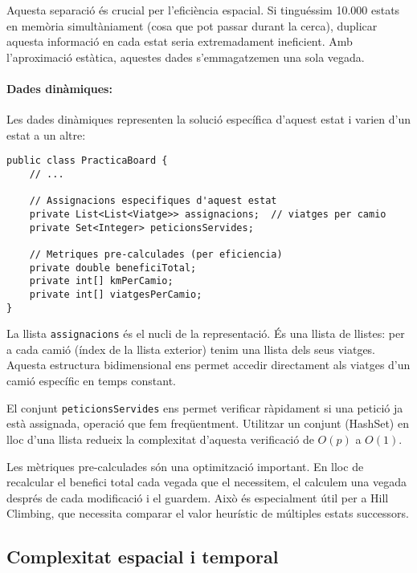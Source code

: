 Aquesta separació és crucial per l'eficiència espacial. Si tinguéssim 10.000 estats en memòria simultàniament (cosa que pot passar durant la cerca), duplicar aquesta informació en cada estat seria extremadament ineficient. Amb l'aproximació estàtica, aquestes dades s'emmagatzemen una sola vegada.

\paragraph{Dades dinàmiques:}

Les dades dinàmiques representen la solució específica d'aquest estat i varien d'un estat a un altre:

\begin{lstlisting}[caption={Dades dinàmiques de l'estat}, label={lst:dynamic-data}]
public class PracticaBoard {
    // ...
    
    // Assignacions especifiques d'aquest estat
    private List<List<Viatge>> assignacions;  // viatges per camio
    private Set<Integer> peticionsServides;
    
    // Metriques pre-calculades (per eficiencia)
    private double beneficiTotal;
    private int[] kmPerCamio;
    private int[] viatgesPerCamio;
}
\end{lstlisting}

La llista \texttt{assignacions} és el nucli de la representació. És una llista de llistes: per a cada camió (índex de la llista exterior) tenim una llista dels seus viatges. Aquesta estructura bidimensional ens permet accedir directament als viatges d'un camió específic en temps constant.

El conjunt \texttt{peticionsServides} ens permet verificar ràpidament si una petició ja està assignada, operació que fem freqüentment. Utilitzar un conjunt (HashSet) en lloc d'una llista redueix la complexitat d'aquesta verificació de $O(p)$ a $O(1)$.

Les mètriques pre-calculades són una optimització important. En lloc de recalcular el benefici total cada vegada que el necessitem, el calculem una vegada després de cada modificació i el guardem. Això és especialment útil per a Hill Climbing, que necessita comparar el valor heurístic de múltiples estats successors.


\vspace{0.5cm}

\subsection{Complexitat espacial i temporal}

